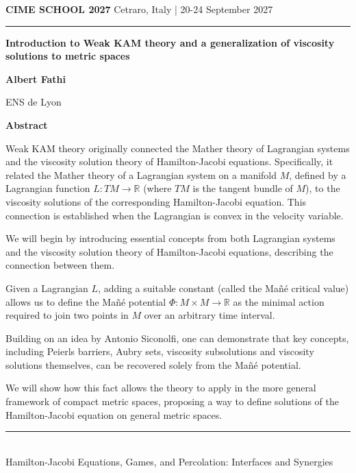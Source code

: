 \documentclass[11pt,a4paper]{article}
\begin{document}
{\small\bfseries\color{cimegold} CIME SCHOOL 2027}\hfill
{\small\color{cimeblue} Cetraro, Italy | 20-24 September 2027}

\vspace{5mm}
{\color{cimenavy}\rule{\textwidth}{1.2pt}}
\vspace{8mm}

{\fontsize{22}{27}\selectfont\bfseries\color{cimenavy}
Introduction to Weak KAM theory and a generalization of viscosity solutions to metric spaces\par}

\vspace{7mm}
{\large\bfseries Albert Fathi}\par
{\color{cimeblue} ENS de Lyon}

\vspace{10mm}
{\large\bfseries\color{cimegold} Abstract}

Weak KAM theory originally connected the Mather theory of Lagrangian systems and the viscosity solution theory of Hamilton-Jacobi equations. Specifically, it related the Mather theory of a Lagrangian system on a manifold $M$, defined by a Lagrangian function $L:TM \to \mathbb{R}$ (where $TM$ is the tangent bundle of $M$), to the viscosity solutions of the corresponding Hamilton-Jacobi equation. This connection is established when the Lagrangian is convex in the velocity variable.

We will begin by introducing essential concepts from both Lagrangian systems and the viscosity solution theory of Hamilton-Jacobi equations, describing the connection between them.

Given a Lagrangian $L$, adding a suitable constant (called the Ma\~n\'e critical value) allows us to define the Ma\~n\'e potential $\Phi: M \times M \to \mathbb{R}$ as the minimal action required to join two points in $M$ over an arbitrary time interval.

Building on an idea by Antonio Siconolfi, one can demonstrate that key concepts, including Peierls barriers, Aubry sets, viscosity subsolutions and viscosity solutions themselves, can be recovered solely from the Ma\~n\'e potential.

We will show how this fact allows the theory to apply in the more general framework of compact metric spaces, proposing a way to define solutions of the Hamilton-Jacobi equation on general metric spaces.

\vfill
{\color{cimenavy}\rule{\textwidth}{0.5pt}}\\[-1mm]
{\footnotesize\color{cimeblue} Hamilton-Jacobi Equations, Games, and Percolation: Interfaces and Synergies}
\end{document}

